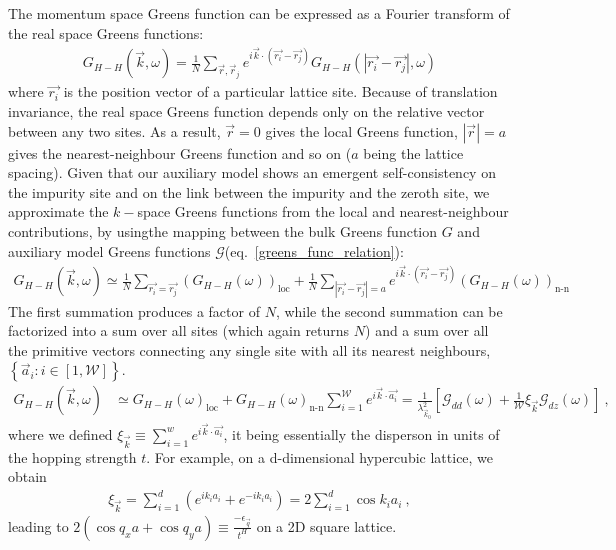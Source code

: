 \documentclass{report}
\numberwithin{equation}{section}
\begin{document}
The momentum space Greens function can be expressed as a Fourier transform of the real space Greens functions:
\begin{equation}\begin{aligned}
	G_{H-H} (\vec k, \omega) = \frac{1}{N}\sum_{\vec r, \vec r_j}e^{i \vec{k}\cdot\left(\vec{r_i} - \vec {r_j}\right)}G_{H-H} (|\vec{r_i} - \vec {r_j}|, \omega)
\end{aligned}\end{equation}
where $\vec{r_i}$ is the position vector of a particular lattice site. Because of translation invariance, the real space Greens function depends only on the relative vector between any two sites. As a result, $\vec r=0$ gives the local Greens function, $|\vec r|=a$ gives the nearest-neighbour Greens function and so on ($a$ being the lattice spacing). Given that our auxiliary model shows an emergent self-consistency on the impurity site and on the link between the impurity and the zeroth site, we approximate the \(k-\)space Greens functions from the local and nearest-neighbour contributions, by usingthe mapping between the bulk Greens function \(G\) and auxiliary model Greens functions \(\mathcal{G}\)(eq.~\ref{greens_func_relation}):
\begin{equation}\begin{aligned}
	G_{H-H} (\vec k, \omega) \simeq \frac{1}{N}\sum_{\vec{r_i} = \vec {r_j}}\left(G_{H-H} (\omega)\right) _\text{loc} + \frac{1}{N}\sum_{|\vec{r_i} - \vec {r_j}|=a} e^{i \vec{k}\cdot\left(\vec{r_i} - \vec {r_j}\right)}\left(G_{H-H} (\omega)\right)_\text{n-n}
\end{aligned}\end{equation}
The first summation produces a factor of $N$, while the second summation can be factorized into a sum over all sites (which again returns $N$) and a sum over all the primitive vectors connecting any single site with all its nearest neighbours, $\left\{ \vec a_i: i \in \left[1, \mathcal{W}\right]\right\}$.
\begin{equation}\begin{aligned}
	\label{k_Gf_siam}
	G_{H-H} (\vec k, \omega) &\simeq G_{H-H} (\omega)_\text{loc} + G_{H-H} (\omega)_\text{n-n}\sum_{i=1}^{\mathcal{W}} e^{i \vec{k}\cdot\vec {a_i}} = \frac{1}{\lambda_{\vec k_0}^2}\left[\mathcal{G}_{dd}(\omega) + \frac{1}{\mathcal{W}}\xi_{\vec k}\mathcal{G}_{dz}(\omega) \right]~,
\end{aligned}\end{equation}
where we defined \(\xi_{\vec k} \equiv \sum_{i=1}^w e^{i \vec{k}\cdot\vec {a_i}}\), it being essentially the disperson in units of the hopping strength \(t\). For example, on a d-dimensional hypercubic lattice, we obtain
\begin{equation}\begin{aligned}
	\xi_{\vec k} = \sum_{i=1}^d \left(e^{i k_i {a_i}} + e^{-i k_i {a_i}}\right) = 2\sum_{i=1}^d \cos k_i a_i~,
\end{aligned}\end{equation}
leading to \(2(\cos q_{x}a + \cos q_{y}a)\equiv \frac{-\epsilon_{\vec{q}}}{t^{H}}\) on a 2D square lattice. 
\end{document}
